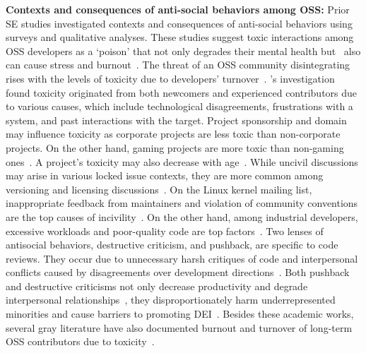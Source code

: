 \vspace{3pt}
\noindent \textbf{Contexts and consequences of anti-social behaviors among OSS:}
Prior SE studies investigated contexts and consequences of anti-social behaviors using surveys and qualitative analyses. 
These studies suggest toxic interactions among OSS developers as a `poison'  that not only degrades their mental health but~\cite{carillo2016towards} also can cause stress and {burnout}~\cite{raman2020stress}.  
The threat of an OSS community disintegrating rises with the levels of toxicity due to developers' turnover~\cite{carillo2016towards}. 
\citet{miller2022did}'s investigation found toxicity originated from both newcomers and experienced contributors due to various causes, which include technological disagreements, frustrations with a system, and past interactions with the target.
Project sponsorship and domain may influence toxicity as corporate projects are less toxic than non-corporate projects. On the other hand, gaming projects are more toxic than non-gaming ones~\cite{raman2020stress}. A project's toxicity may also decrease with age~\cite{raman2020stress}.
While uncivil discussions may arise in various locked issue contexts, they are more common among versioning and licensing discussions~\cite {ferreira2022heated}. On the Linux kernel mailing list, inappropriate feedback from maintainers and violation of community conventions are the top causes of incivility~\cite{ferreira2021shut}. On the other hand, among industrial developers, excessive workloads and poor-quality code are top factors~\cite{rahman2024words}.
Two lenses of antisocial behaviors, destructive criticism, and pushback, are specific to code reviews. They occur due to unnecessary harsh critiques of code and interpersonal conflicts caused by disagreements over development directions~\cite{egelman2020predicting,murphy2022pushback,gunawardena2022destructive}. 
Both pushback and destructive criticisms not only decrease productivity and degrade interpersonal relationships~\cite{murphy2022pushback,egelman2020predicting}, they disproportionately harm underrepresented minorities and cause barriers to promoting DEI~\cite{gunawardena2022destructive}.
Besides these academic works, several gray literature have also documented {burnout} and turnover of long-term OSS contributors due to toxicity~\cite{toxic-blog-linux1,toxic-blog-linux2,toxic-blog-linux3,toxic-open-source-maintainer,perl-toxicity,leaving-for-toxicity,perl-toxic-2}.


